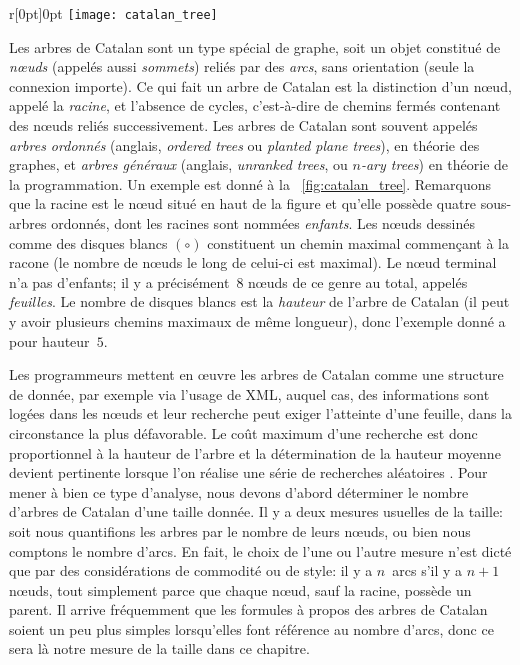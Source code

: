 %
\begin{wrapfigure}[9]{r}[0pt]{0pt}
\centering
\texttt{[image: catalan\_tree]}
\caption{Arbre de Catalan de hauteur~5\label{fig:catalan_tree}}
\end{wrapfigure}
Les arbres de Catalan sont un type spécial de graphe, soit un objet
constitué de \emph{n{\oe}uds} (appelés aussi \emph{sommets}) reliés
par des \emph{arcs}, sans orientation (seule la connexion importe). Ce
qui fait un arbre de Catalan est la distinction d'un n{\oe}ud, appelé
la \emph{racine}, et l'absence de cycles, c'est-à-dire de chemins
fermés contenant des n{\oe}uds reliés successivement. Les arbres de
Catalan sont souvent appelés \emph{arbres ordonnés} (anglais,
\emph{ordered trees} ou \emph{planted plane trees}), en théorie des
graphes, et \emph{arbres généraux} (anglais, \emph{unranked trees}, ou
\emph{\(n\)-ary trees}) en théorie de la programmation. Un exemple est
donné à la \fig~\ref{fig:catalan_tree}. Remarquons que la racine est
le n{\oe}ud situé en haut de la figure et qu'elle possède quatre
sous-arbres ordonnés, dont les racines sont nommées
\emph{enfants}. Les n{\oe}uds dessinés comme des disques blancs
\((\circ)\) constituent un chemin maximal commençant à la racone (le
nombre de n{\oe}uds le long de celui-ci est maximal). Le n{\oe}ud
terminal n'a pas d'enfants; il y a précisément~\(8\) n{\oe}uds de ce
genre au total, appelés \emph{feuilles}. Le nombre de disques blancs
est la \emph{hauteur} de l'arbre de Catalan (il peut y avoir plusieurs
chemins maximaux de même longueur), donc l'exemple donné a pour
hauteur~\(5\).

Les programmeurs mettent en {\oe}uvre les arbres de Catalan comme une
structure de donnée, par exemple via l'usage de \textsf{XML}, auquel
cas, des informations sont logées dans les n{\oe}uds et leur recherche
peut exiger l'atteinte d'une feuille, dans la circonstance la plus
défavorable. Le coût maximum d'une recherche est donc proportionnel à
la hauteur de l'arbre et la détermination de la hauteur moyenne
devient pertinente lorsque l'on réalise une série de recherches
aléatoires \citep{VitterFlajolet_1990}. Pour mener à bien ce type
d'analyse, nous devons d'abord déterminer le nombre d'arbres de
Catalan d'une taille donnée. Il y a deux mesures usuelles de la
taille: soit nous quantifions les arbres par le nombre de leurs
n{\oe}uds, ou bien nous comptons le nombre d'arcs. En fait, le choix
de l'une ou l'autre mesure n'est dicté que par des considérations de commodité ou de style: il y a \(n\)~arcs s'il y a \(n+1\) n{\oe}uds, tout simplement parce que chaque n{\oe}ud, sauf la racine, possède un parent. Il arrive fréquemment que les formules à propos des arbres de Catalan soient un peu plus simples lorsqu'elles font référence au nombre d'arcs, donc ce sera là notre mesure de la taille dans ce chapitre.

